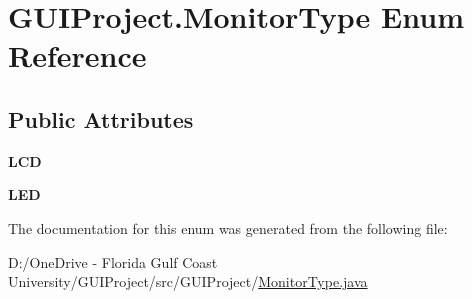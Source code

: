 \hypertarget{enum_g_u_i_project_1_1_monitor_type}{}\section{G\+U\+I\+Project.\+Monitor\+Type Enum Reference}
\label{enum_g_u_i_project_1_1_monitor_type}
\subsection*{Public Attributes}
\begin{DoxyCompactItemize}
\item 
\mbox{\label{enum_g_u_i_project_1_1_monitor_type_aaf9ee51ba5ee38b14b8b46a6e3c0ddd9}} 
{\bfseries L\+CD}
\item 
\mbox{\label{enum_g_u_i_project_1_1_monitor_type_a13c7191ff5310a90038b0e3338fec9f3}} 
{\bfseries L\+ED}
\end{DoxyCompactItemize}


The documentation for this enum was generated from the following file\+:\begin{DoxyCompactItemize}
\item 
D\+:/\+One\+Drive -\/ Florida Gulf Coast University/\+G\+U\+I\+Project/src/\+G\+U\+I\+Project/\mbox{\hyperlink{_monitor_type_8java}{Monitor\+Type.\+java}}\end{DoxyCompactItemize}
